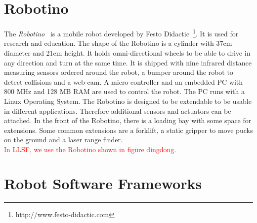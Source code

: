 \section{Robotino}
The \textit{Robotino}~\cite{Robotino} is a mobile robot developed by Festo Didactic~\footnote{http://www.festo-didactic.com}. It is used for research and education. The shape of the Robotino is a cylinder with 37cm diameter and 21cm height. It holds omni-directional wheels to be able to drive in any direction and turn at the same time. It is shipped with nine infrared distance measuring sensors ordered around the robot, a bumper around the robot to detect collisions and a web-cam. A micro-controller and an embedded PC with 800 MHz and 128 MB RAM are used to control the robot. The PC runs with a Linux Operating System. The Robotino is designed to be extendable to be usable in different applications. Therefore additional sensors and actuators can be attached. In the front of the Robotino, there is a loading bay with some space for extensions. Some common extensions are a forklift, a static gripper to move pucks on the ground and a laser range finder.\\
\textcolor{red}{In LLSF, we use the Robotino shown in figure dingdong.}


\section{Robot Software Frameworks}
